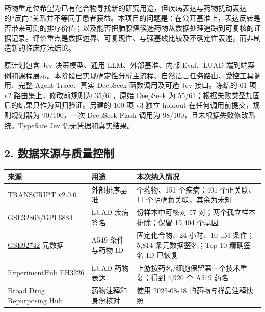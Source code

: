 \documentclass[
  10pt,
]{ctexart}
\newcounter{none} %
\begin{document}
药物重定位希望为已有化合物寻找新的研究用途，但疾病表达与药物扰动表达的``反向''关系并不等同于患者获益。本项目的问题是：在公开基准上，表达反转是否带来可测的排序价值；以及能否把肺腺癌候选药物从数据处理追踪到可复核的证据记录。评价重点是数据边界、可复现性、与强基线比较及不确定性表述，而非制造新的临床疗法结论。

原计划包含 Jev 决策模型、通用 LLM、外部基准、内部 Eval、LUAD
端到端案例和课程展示。本阶段已实现确定性分析主流程、自然语言任务路由、受控工具调用、完整
Agent Trace、真实 DeepSeek 函数调用及可选 Jev 接口。冻结的 61 项 v2
路由集上，修改前规则为 35/61，原始 DeepSeek 为
55/61；根据失败类型加固后的结果只作为回归验证。另建的 100 项 v3 独立
holdout 在任何调用前提交，规则规划器为 90/100，一次 DeepSeek Flash
调用为 98/100，且未根据失败修改系统。TypeSafe Jev 仍无凭据和真实结果。

\subsection{2.
数据来源与质量控制}\label{2-ux6570ux636eux6765ux6e90ux4e0eux8d28ux91cfux63a7ux5236}

{\def\LTcaptype{none} %
\begin{longtable}[]{@{}>{\raggedright\arraybackslash}p{}>{\raggedright\arraybackslash}p{}>{\raggedright\arraybackslash}p{}@{}}
\toprule\noalign{}
来源 & 用途 & 本次纳入情况 \\
\midrule\noalign{}
\endhead
\bottomrule\noalign{}
\endlastfoot
\href{https://zenodo.org/records/7982976}{TRANSCRIPT v2.0.0} &
外部排序基准 & 613 个药物、151 个疾病；401 个正关联、11
个明确负关联，其余为未知 \\
\href{https://www.ncbi.nlm.nih.gov/geo/query/acc.cgi?acc=GSE32863}{GSE32863/GPL6884}
& LUAD 疾病签名 & 116 份样本中可核对 57 对；两个孤立样本排除；保留
19,404 个基因 \\
\href{https://www.ncbi.nlm.nih.gov/geo/query/acc.cgi?acc=GSE92742}{GSE92742}
元数据 & A549 条件与药物 ID & 固定化合物、24 小时、10 µM 条件；5,814
条元数据签名；Top-10 精确签名 ID 已恢复 \\
\href{https://bioconductor.org/packages/release/data/experiment/html/signatureSearchData.html}{ExperimentHub
EH3226} & LUAD 药物表达 & 上游按药名/细胞保留第一个技术重复；得到 4,920
个 A549 药名 \\
\href{https://repo-hub.broadinstitute.org/repurposing}{Broad Drug
Repurposing Hub} & 药物注释和身份核对 & 使用 2025-08-18
的药物与样品注释快照 \\
\end{longtable}
}
\end{document}
